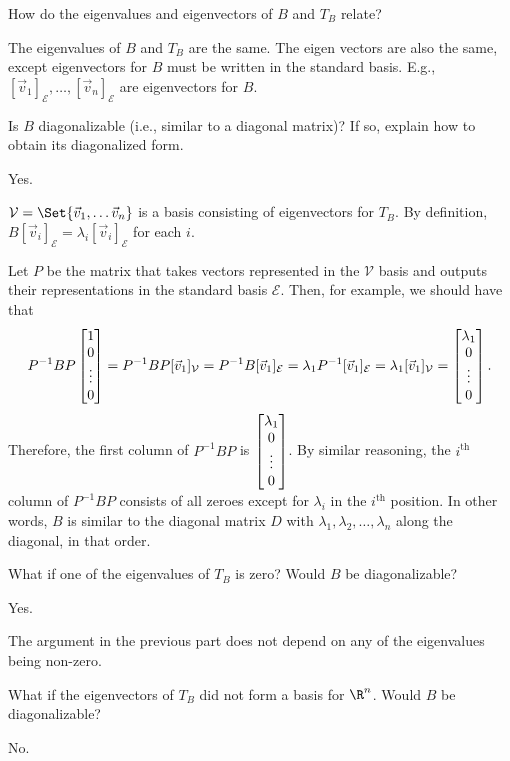\documentclass{problemset}
\begin{document}
	\begin{parts}
		\item How do the eigenvalues and eigenvectors of $B$ and $T_B$ relate?
		\begin{solution}
			The eigenvalues of $B$ and $T_B$ are the same. The eigen vectors
			are also the same, except eigenvectors for $B$ must be written
			in the standard basis. E.g., $[\vec v_1]_{\mathcal E},\ldots,[\vec v_n]_{\mathcal E}$
			are eigenvectors for $B$.
		\end{solution}
		\item Is $B$ diagonalizable (i.e., similar to a diagonal matrix)?  If so, explain how to obtain its diagonalized form.
		\begin{solution}
			Yes. 

			$\mathcal V=\Set{\vec v_1,\ldots \vec v_n}$ is a basis consisting
			of eigenvectors for $T_B$. By definition, $B[\vec v_i]_{\mathcal E}=\lambda_i[\vec v_i]_{\mathcal E}$
			for each $i$. 

			Let $P$ be the matrix that takes vectors represented in the
			$\mathcal V$ basis and outputs their representations in the standard
			basis $\mathcal E$. Then, for example, we should have that
			\[
				P^{-1}BP\begin{bmatrix}1\\0\\\vdots\\0\end{bmatrix}
				=P^{-1}BP[\vec v_1]_{\mathcal V}
				=P^{-1}B[\vec v_1]_{\mathcal E}
				=\lambda_1P^{-1}[\vec v_1]_{\mathcal E}
				=\lambda_1[\vec v_1]_{\mathcal V}
				=\begin{bmatrix}\lambda_1\\0\\\vdots\\0\end{bmatrix}.
			\]
			Therefore, the first column of $P^{-1}BP$ is $\begin{bmatrix}\lambda_1\\0\\\vdots\\0\end{bmatrix}$.
			By similar reasoning, the $i^\text{th}$ column of $P^{-1}BP$ consists
			of all zeroes except for $\lambda_i$ in the $i^\text{th}$ position. 
			In other words, $B$ is similar to the diagonal matrix $D$ with 
			$\lambda_1, \lambda_2, \dots, \lambda_n$ along the diagonal, in that
			order. 
		\end{solution}
		\item What if one of the eigenvalues of $T_B$ is zero?  Would $B$ be diagonalizable?
			\begin{solution}
				Yes. 

				The argument in the previous part does not depend on any of the
				eigenvalues being non-zero.
			\end{solution}
		\item What if the eigenvectors of $T_B$ did not form a basis for $\R^n$.
			Would $B$ be diagonalizable?
			\begin{solution}
				No. 


\end{solution}
\end{parts}
\end{document}
